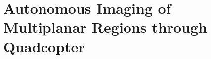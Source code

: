 \chapter[Multiplanar Imaging]{Autonomous Imaging of Multiplanar Regions through
Quadcopter}
\label{ch:multiplanar}